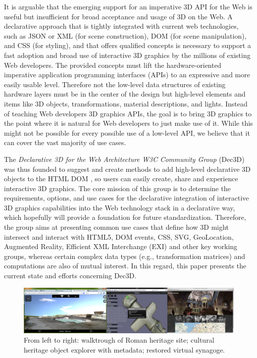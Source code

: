 \documentclass[review]{acmsiggraph}
\begin{document}
It is arguable that the emerging support for an imperative 3D API for the Web is useful but insufficient for broad acceptance and usage of 3D on the Web. A declarative approach that is tightly integrated with current web technologies, such as JSON or XML (for scene construction), DOM (for scene manipulation), and CSS (for styling), and that offers qualified concepts is necessary to support a fast adoption and broad use of interactive 3D graphics by the millions of existing Web developers. The provided concepts must lift the hardware-oriented imperative application programming interfaces (APIs) to an expressive and more easily usable level. Therefore not the low-level data structures of existing hardware layers must be in the center of the design but high-level elements and items like 3D objects, transformations, material descriptions, and lights. Instead of teaching Web developers 3D graphics APIs, the goal is to bring 3D graphics to the point where it is natural for Web developers to just make use of it. While this might not be possible for every possible use of a low-level API, we believe that it can cover the vast majority of use cases.

The \textit{Declarative 3D for the Web Architecture W3C Community Group} (Dec3D) \cite{Dec3D} was thus founded to suggest and create methods to add high-level declarative 3D objects to the HTML DOM \cite{W3C-DOM}, so users can easily create, share and experience interactive 3D graphics. The core mission of this group is to determine the requirements, options, and use cases for the declarative integration of interactive 3D graphics capabilities into the Web technology stack in a declarative way, which hopefully will provide a foundation for future standardization.
Therefore, the group aims at presenting common use cases that define how 3D might intersect and interact with HTML5, DOM events, CSS, SVG, GeoLocation, Augmented Reality, Efficient XML Interchange (EXI) and other key working groups, whereas certain complex data types (e.g., transformation matrices) and computations are also of mutual interest. In this regard, this paper presents the current state and efforts concerning Dec3D.

\begin{figure}%
  \centering
  \includegraphics[width=1.0\textwidth]{images/ch_apps.png}
  \caption{From left to right: walktrough of Roman heritage site; cultural heritage object explorer with metadata; restored virtual synagoge.}
  \label{fig:chApps}
  \vspace{-0.2cm}
\end{figure}
\end{document}
